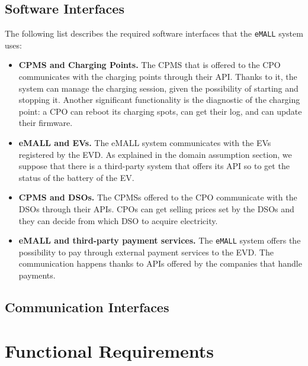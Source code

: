 \subsection{Software Interfaces}
\label{subsec:software_interfaces}%
The following list describes the required software interfaces that the \verb|eMALL| system uses:
\begin{itemize}
    \item \textbf{CPMS and Charging Points.} The CPMS that is offered to the CPO communicates with the charging points
    through their API\@.
    Thanks to it, the system can manage the charging session, given the possibility of starting and stopping it.
    Another significant functionality is the diagnostic of the charging point:
    a CPO can reboot its charging spots, can get their log, and can update their firmware.
    \item \textbf{eMALL and EVs.} The eMALL system communicates with the EVs registered by the EVD\@.
    As explained in the domain assumption section, we suppose that there is a third-party system that offers its API
    so to get the status of the battery of the EV\@.
    \item \textbf{CPMS and DSOs.} The CPMSs offered to the CPO communicate with the DSOs through their APIs.
    CPOs can get selling prices set by the DSOs and they can decide from which DSO to acquire electricity.
    \item \textbf{eMALL and third-party payment services.} The \verb|eMALL| system offers the possibility to pay through
    external payment services to the EVD. The communication happens thanks to APIs offered by the companies that handle payments.
\end{itemize}

\subsection{Communication Interfaces}
\label{subsec:communication_interfaces}%


\section{Functional Requirements}
\label{sec:functional_requirements}%


